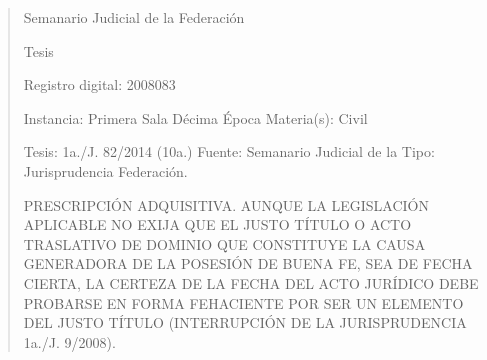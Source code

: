 \documentclass[11pt,a4paper]{article}
\begin{document}
\begin{quote}
                                                   Semanario Judicial de la Federación

                                                Tesis

 Registro digital: 2008083

 Instancia: Primera Sala           Décima Época                           Materia(s): Civil

 Tesis: 1a./J. 82/2014 (10a.)      Fuente: Semanario Judicial de la       Tipo: Jurisprudencia
                                   Federación.


PRESCRIPCIÓN ADQUISITIVA. AUNQUE LA LEGISLACIÓN APLICABLE NO EXIJA QUE EL
JUSTO TÍTULO O ACTO TRASLATIVO DE DOMINIO QUE CONSTITUYE LA CAUSA
GENERADORA DE LA POSESIÓN DE BUENA FE, SEA DE FECHA CIERTA, LA CERTEZA DE LA
FECHA DEL ACTO JURÍDICO DEBE PROBARSE EN FORMA FEHACIENTE POR SER UN
ELEMENTO DEL JUSTO TÍTULO (INTERRUPCIÓN DE LA JURISPRUDENCIA 1a./J. 9/2008).



\end{quote}
\end{document}
